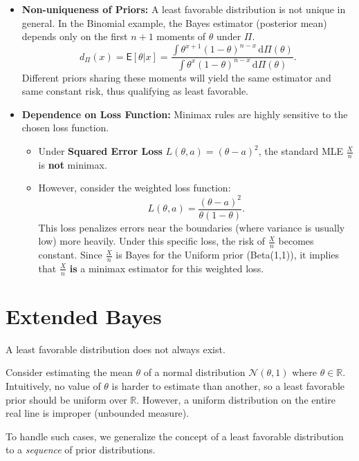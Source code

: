 \begin{remark}[]
\leavevmode    
\begin{itemize}
    \item \textbf{Non-uniqueness of Priors:} A least favorable distribution is not unique in general. In the Binomial example, the Bayes estimator (posterior mean) depends only on the first \(n+1\) moments of \(\theta\) under \(\Pi\).
    \[ d_{\Pi}(x) = \mathsf{E}[\theta|x] = \frac{\int \theta^{x+1} (1-\theta)^{n-x} \, \mathrm{d}\Pi(\theta)}{\int \theta^x (1-\theta)^{n-x} \, \mathrm{d}\Pi(\theta)}. \]
    Different priors sharing these moments will yield the same estimator and same constant risk, thus qualifying as least favorable.
    
    \item \textbf{Dependence on Loss Function:} Minimax rules are highly sensitive to the chosen loss function.
    \begin{itemize}
        \item Under \textbf{Squared Error Loss} \(L(\theta, a) = (\theta-a)^2\), the standard MLE \(\frac{X}{n}\) is \textbf{not} minimax.
        \item However, consider the weighted loss function:
        \[ L(\theta, a) = \frac{(\theta - a)^2}{\theta(1 - \theta)}. \]
        This loss penalizes errors near the boundaries (where variance is usually low) more heavily. Under this specific loss, the risk of \(\frac{X}{n}\) becomes constant. Since \(\frac{X}{n}\) is Bayes for the Uniform prior (Beta(1,1)), it implies that \(\frac{X}{n}\) \textbf{is} a minimax estimator for this weighted loss.
    \end{itemize}
\end{itemize}
\end{remark}

\section{Extended Bayes}
\label{sec:extended_bayes}

A least favorable distribution does not always exist. 

Consider estimating the mean \(\theta\) of a normal distribution \(\mathcal{N}(\theta, 1)\) where \(\theta \in \mathbb{R}\). Intuitively, no value of \(\theta\) is harder to estimate than another, so a least favorable prior should be uniform over \(\mathbb{R}\). However, a uniform distribution on the entire real line is improper (unbounded measure).

To handle such cases, we generalize the concept of a least favorable distribution to a \emph{sequence} of prior distributions.

